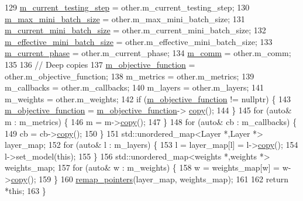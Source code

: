 \begin{DoxyCode}
129   \hyperlink{classlbann_1_1model_a2acf043862ba878cb7a91cb0d26c3791}{m\_current\_testing\_step} = other.m\_current\_testing\_step;
130   \hyperlink{classlbann_1_1model_acc496503e7cf8d635e5a31ba09b3c81a}{m\_max\_mini\_batch\_size} = other.m\_max\_mini\_batch\_size;
131   \hyperlink{classlbann_1_1model_a982cea92d230bab5a47df504f02daf98}{m\_current\_mini\_batch\_size} = other.m\_current\_mini\_batch\_size;
132   \hyperlink{classlbann_1_1model_a4887fd2816e7c51b24cb8bf8e4a80a1c}{m\_effective\_mini\_batch\_size} = other.m\_effective\_mini\_batch\_size;
133   \hyperlink{classlbann_1_1model_a150ef033f81982936e007b10c421f488}{m\_current\_phase} = other.m\_current\_phase;
134   \hyperlink{classlbann_1_1model_a0eabaf2b2f829fd5db3dfd26df420df0}{m\_comm} = other.m\_comm;
135 
136   \textcolor{comment}{// Deep copies}
137   \hyperlink{classlbann_1_1model_a24c50e7108dd7698671aed7df5b22e8b}{m\_objective\_function} = other.m\_objective\_function;
138   m\_metrics            = other.m\_metrics;
139   m\_callbacks          = other.m\_callbacks;
140   m\_layers             = other.m\_layers;
141   m\_weights            = other.m\_weights;
142   \textcolor{keywordflow}{if} (\hyperlink{classlbann_1_1model_a24c50e7108dd7698671aed7df5b22e8b}{m\_objective\_function} != \textcolor{keyword}{nullptr}) \{
143     \hyperlink{classlbann_1_1model_a24c50e7108dd7698671aed7df5b22e8b}{m\_objective\_function} = \hyperlink{classlbann_1_1model_a24c50e7108dd7698671aed7df5b22e8b}{m\_objective\_function}->
      \hyperlink{classlbann_1_1objective__function_a8ab03f0dc1d2c067b895f5859bacd810}{copy}();
144   \}
145   \textcolor{keywordflow}{for} (\textcolor{keyword}{auto}& m : m\_metrics) \{
146     m = m->\hyperlink{classlbann_1_1objective__function_a8ab03f0dc1d2c067b895f5859bacd810}{copy}();
147   \}
148   \textcolor{keywordflow}{for} (\textcolor{keyword}{auto}& cb : m\_callbacks) \{
149     cb = cb->\hyperlink{classlbann_1_1objective__function_a8ab03f0dc1d2c067b895f5859bacd810}{copy}();
150   \}
151   std::unordered\_map<Layer *,Layer *> layer\_map;
152   \textcolor{keywordflow}{for} (\textcolor{keyword}{auto}& l : m\_layers) \{
153     l = layer\_map[l] = l->\hyperlink{classlbann_1_1objective__function_a8ab03f0dc1d2c067b895f5859bacd810}{copy}();
154     l->set\_model(\textcolor{keyword}{this});
155   \}
156   std::unordered\_map<weights *,weights *> weights\_map;
157   \textcolor{keywordflow}{for} (\textcolor{keyword}{auto}& w : m\_weights) \{
158     w = weights\_map[w] = w->\hyperlink{classlbann_1_1objective__function_a8ab03f0dc1d2c067b895f5859bacd810}{copy}();
159   \}
160   \hyperlink{classlbann_1_1model_ac6cc0f5d850cfb997bbbc70eefa0d68f}{remap\_pointers}(layer\_map, weights\_map);
161 
162   \textcolor{keywordflow}{return} *\textcolor{keyword}{this};
163 \}
\end{DoxyCode}
